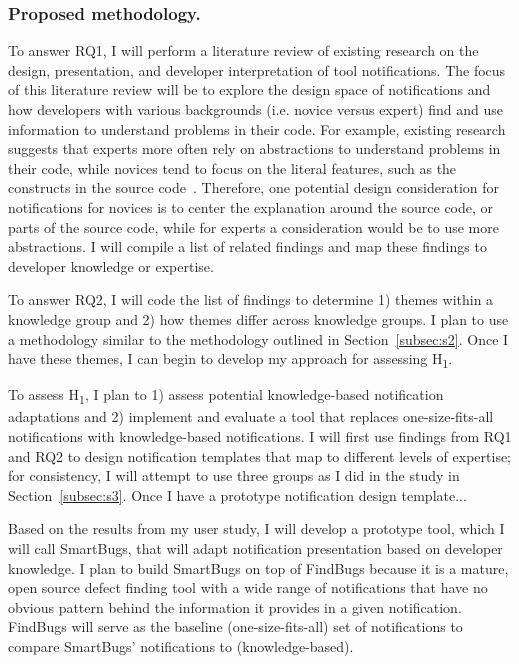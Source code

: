 \documentclass{llncs}
\begin{document}
\subsubsection{Proposed methodology.}
To answer RQ1, I will perform a literature review of existing research on the design, presentation, and developer interpretation of tool notifications. The focus of this literature review will be to explore the design space of notifications and how developers with various backgrounds (i.e. novice versus expert) find and use information to understand problems in their code. For example, existing research suggests that experts more often rely on abstractions to understand problems in their code, while novices tend to focus on the literal features, such as the constructs in the source code~\cite{Weiser:1983:Representation}. Therefore, one potential design consideration for notifications for novices is to center the explanation around the source code, or parts of the source code, while for experts a consideration would be to use more abstractions. I will compile a list of related findings and map these findings to developer knowledge or expertise.

To answer RQ2, I will code the list of findings to determine 1) themes within a knowledge group and 2) how themes differ across knowledge groups. I plan to use a methodology similar to the methodology outlined in Section~\ref{subsec:s2}. Once I have these themes, I can begin to develop my approach for assessing H\textsubscript{1}. 

To assess H\textsubscript{1}, I plan to 1) assess potential knowledge-based notification adaptations and 2) implement and evaluate a tool that replaces one-size-fits-all notifications with knowledge-based notifications. 
I will first use findings from RQ1 and RQ2 to design notification templates that map to different levels of expertise; for consistency, I will attempt to use three groups as I did in the study in Section~\ref{subsec:s3}. 
Once I have a prototype notification design template...

Based on the results from my user study, I will develop a prototype tool, which I will call SmartBugs, that will adapt notification presentation based on developer knowledge. I plan to build SmartBugs on top of FindBugs because it is a mature, open source defect finding tool with a wide range of notifications that have no obvious pattern behind the information it provides in a given notification. FindBugs will serve as the baseline (one-size-fits-all) set of notifications to compare SmartBugs' notifications to (knowledge-based).
\end{document}
